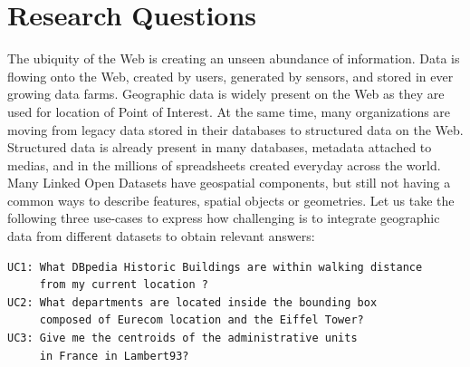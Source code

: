 \begin{figure}[ht!]
\end{figure}



\section{Research Questions}
\label{sec:questions}
 

The ubiquity of the Web is creating an unseen abundance of information. Data is flowing onto the Web, created by users, generated by sensors, and stored in ever growing data farms. Geographic data is widely present on the Web as they are used for location of Point of Interest. At the same time, many organizations are moving from legacy data stored in their databases to structured data on the Web. Structured data is already present in many databases, metadata attached to medias, and in the millions of spreadsheets created everyday across the world. 
Many Linked Open Datasets have geospatial components, but still not having a common ways to describe features, spatial objects or geometries. Let us take the following three use-cases to express how challenging is to integrate geographic data from different datasets to obtain relevant answers: 
\begin{verbatim}
UC1: What DBpedia Historic Buildings are within walking distance 
     from my current location ?
UC2: What departments are located inside the bounding box 
     composed of Eurecom location and the Eiffel Tower? 
UC3: Give me the centroids of the administrative units 
     in France in Lambert93?

\end{verbatim} 

